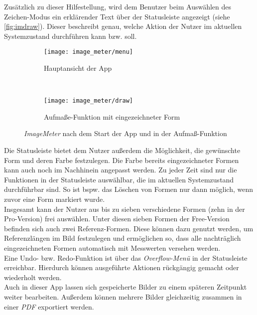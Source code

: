 Zusätzlich zu dieser Hilfestellung, wird dem Benutzer beim Auswählen des Zeichen-Modus ein erklärender Text über der Statusleiste angezeigt (siehe \autoref{fig:imdraw}).
Dieser beschreibt genau, welche Aktion der Nutzer im aktuellen Systemzustand durchführen kann bzw. soll. \\

\begin{figure}[h]
  \begin{subfigure}[t]{0.4\textwidth}
    \centering
    \texttt{[image: image\_meter/menu]}
    \caption{Hauptansicht der App}
    \label{fig:immenu}	
  \end{subfigure}
  ~
  \begin{subfigure}[t]{0.4\textwidth}
    \centering
    \texttt{[image: image\_meter/draw]}
    \caption{Aufmaße-Funktion mit eingezeichneter Form} 
    \label{fig:imdraw}	
  \end{subfigure}
  \centering
  \caption{\emph{ImageMeter} nach dem Start der App und in der Aufmaß-Funktion}
\end{figure}

\noindent
Die Statusleiste bietet dem Nutzer außerdem die Möglichkeit, die gewünschte Form und deren Farbe festzulegen.
Die Farbe bereits eingezeichneter Formen kann auch noch im Nachhinein angepasst werden.
Zu jeder Zeit sind nur die Funktionen in der Statusleiste auswählbar, die im aktuellen Systemzustand durchführbar sind.
So ist bspw. das Löschen von Formen nur dann möglich, wenn zuvor eine Form markiert wurde. \\

Insgesamt kann der Nutzer aus bis zu sieben verschiedene Formen (zehn in der Pro-Version) frei auswählen.
Unter diesen sieben Formen der Free-Version befinden sich auch zwei Referenz-Formen.
Diese können dazu genutzt werden, um Referenzlängen im Bild festzulegen und ermöglichen so, dass alle nachträglich eingezeichneten Formen automatisch mit Messwerten versehen werden. \\

Eine Undo- bzw. Redo-Funktion ist über das \emph{Overflow-Menü} in der Statusleiste erreichbar.
Hierdurch können ausgeführte Aktionen rückgängig gemacht oder wiederholt werden. \\

Auch in dieser App lassen sich gespeicherte Bilder zu einem späteren Zeitpunkt weiter bearbeiten.
Außerdem können mehrere Bilder gleichzeitig zusammen in einer \emph{PDF} exportiert werden.

